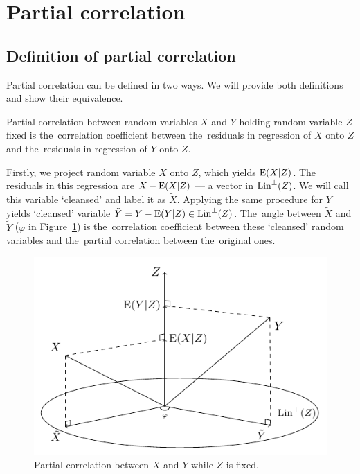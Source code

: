 \section{Partial correlation}

\subsection{Definition of partial correlation}


Partial correlation can be defined in two ways.
We will provide both definitions and show their equivalence.

\begin{definition}
Partial correlation between random variables $X$ and $Y$ holding random variable $Z$
fixed is the~correlation coefficient between the~residuals in regression of $X$ onto
$Z$ and the~residuals in regression of $Y$ onto $Z$.
\end{definition}

Firstly, we project random variable $X$ onto $Z$, which yields $\operatorname{E}(X \vert Z)$.
The residuals in this regression are $X - \operatorname{E}(X \vert Z)$ — a vector in $\operatorname{Lin}^{\perp}(Z)$.
We will call this variable `cleansed' and label it as $\widetilde X$.
Applying the same procedure for $Y$ yields `cleansed' variable $\tilde Y = Y - \operatorname{E}(Y \vert Z) \in \operatorname{Lin}^{\perp}(Z)$.
The~angle between $\widetilde X$ and $\widetilde Y$ ($\varphi$ in Figure~\ref{fig:pcorr_def1})
is the~correlation coefficient between these `cleansed' random variables and
the~partial correlation between the~original ones.

\begin{figure}
\centering
\includegraphics[width=0.55\linewidth]{figures/03_partial_correlation_definition.pdf}
\caption{Partial correlation between $X$ and $Y$ while $Z$ is fixed.}
\label{fig:pcorr_def1}
\end{figure}

